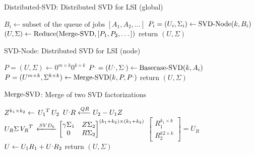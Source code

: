 \begin{frame}[plain]
\begin{algorithm}[H] 
  \caption{Distributed-SVD: Distributed SVD for LSI (global)}
%
  \DontPrintSemicolon
%
%
%
    {
      $B_i \gets \text{subset of the queue of jobs } [A_1,A_2,\dots]$ \;
%
      $P_i = (U_i,\Sigma_i) \gets \operatorname{SVD-Node}(k,B_i)$ \;
    }
    $(U,\Sigma) \gets \operatorname{Reduce}(\operatorname{Merge-SVD},[P_1,P_2,\dots])$ \;
%
    return $(U, \Sigma)$ \;
\end{algorithm}
\end{frame}
\begin{frame}[plain]
\begin{algorithm}[H]
  \caption{SVD-Node: Distributed SVD for LSI (node)}
%
  \DontPrintSemicolon
%
%
%
  $P = (U,\Sigma) \gets 0^{m \times k} 0^{k \times k}$ \;
%
  {
    $\prim{P} = (\prim{U},\prim{\Sigma}) \gets \func{Basecase-SVD}(k,A_i)$ \;
%
    $P = (U^{m \times k},\Sigma^{k \times k}) \gets \func{Merge-SVD}(k, P, \prim{P})$ \;
  }
%
  return $(U,\Sigma)$ \;
\end{algorithm}
\end{frame}
\begin{frame}[plain]
\begin{algorithm}[H]
  \label{alg:merge-svd}
  \caption{$\operatorname{Merge-SVD}$: Merge of two SVD factorizations}
%
  \DontPrintSemicolon
%
%
%
  $Z^{k_1 \times k_2} \gets \,{U_1}^{T}\,U_2$ \;
%
  $\prim{U} R \xleftarrow{QR} U_2 - U_1 Z$ \;
%
  $U_R \Sigma\,{V_R}^{T}\, \xleftarrow{SVD_k}
    \begin{bmatrix}
      \gamma\Sigma_1 & Z \Sigma_2 \\
      0 & R\Sigma_2
    \end{bmatrix}^{(k_1 + k_2) \times (k_1 + k_2)}$ \;
%
  $\begin{bmatrix}
      R_1^{k_1 \times k} \\
      R_2^{k2 \times k}
    \end{bmatrix} = U_R$ \;
%
  $U \gets U_1R_1 + \prim{U}R_2$ \;
%
  return $(U,\Sigma)$ \;
\end{algorithm}
\end{frame}
